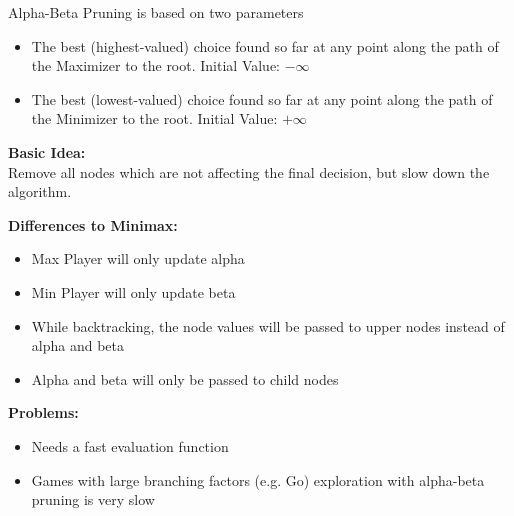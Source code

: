 \documentclass[
../../EiKI_Summary.tex,
]
{subfiles}
\begin{document}
Alpha-Beta Pruning is based on two parameters
\begin{itemize}
    \item {} The best (highest-valued) choice found so far at any point along the path of the Maximizer to the root. Initial Value: $-\infty$
    \item {} The best (lowest-valued) choice found so far at any point along the path of the Minimizer to the root. Initial Value: $+\infty$ 
\end{itemize}

\textbf{Basic Idea:}\\
Remove all nodes which are not affecting the final decision, but slow down the algorithm.

\begin{codebox}
    \begin{algorithm}[H]

    \end{algorithm}
\end{codebox}

\newpage
\textbf{Differences to Minimax:}
\begin{itemize}
    \item Max Player will only update alpha
    \item Min Player will only update beta
    \item While backtracking, the node values will be passed to upper nodes instead of alpha and beta
    \item Alpha and beta will only be passed to child nodes
\end{itemize}

\textbf{Problems:}
\begin{itemize}
    \item Needs a fast evaluation function
    \item Games with large branching factors (e.g. Go) exploration with alpha-beta pruning is very slow
\end{itemize}
\end{document}
